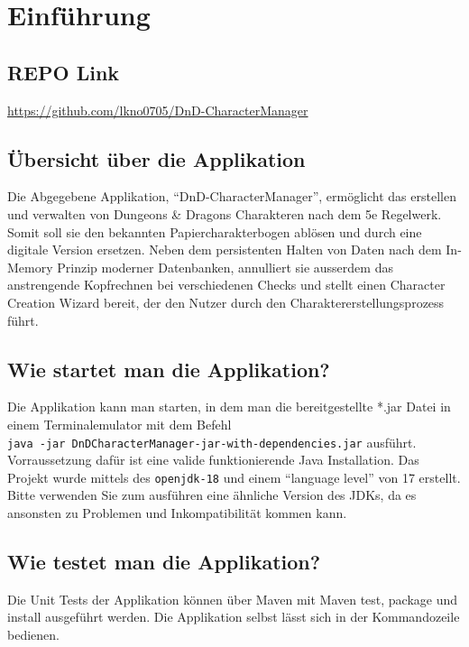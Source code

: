 \chapter{Einführung}

\section{REPO Link}
\href{https://github.com/lkno0705/DnD-CharacterManager}{https://github.com/lkno0705/DnD-CharacterManager}

\section{Übersicht über die Applikation}
Die Abgegebene Applikation, \enquote{DnD-CharacterManager}, ermöglicht das erstellen und verwalten von Dungeons \& Dragons Charakteren nach dem 5e Regelwerk. Somit soll sie den bekannten Papiercharakterbogen ablösen und durch eine digitale Version ersetzen. Neben dem persistenten Halten von Daten nach dem In-Memory Prinzip moderner Datenbanken, annulliert sie ausserdem das anstrengende Kopfrechnen bei verschiedenen Checks und stellt einen Character Creation Wizard bereit, der den Nutzer durch den Charaktererstellungsprozess führt.

\section{Wie startet man die Applikation?}
Die Applikation kann man starten, in dem man die bereitgestellte *.jar Datei in einem Terminalemulator mit dem Befehl
\\\texttt{java -jar DnDCharacterManager-jar-with-dependencies.jar} ausführt. Vorraussetzung dafür ist eine valide funktionierende Java Installation. Das Projekt wurde mittels des \texttt{openjdk-18} und einem \enquote{language level} von 17 erstellt. Bitte verwenden Sie zum ausführen eine ähnliche Version des JDKs, da es ansonsten zu Problemen und Inkompatibilität kommen kann.

\section{Wie testet man die Applikation?}
Die Unit Tests der Applikation können über Maven mit Maven test, package und install ausgeführt werden. Die Applikation selbst lässt sich in der Kommandozeile bedienen.
